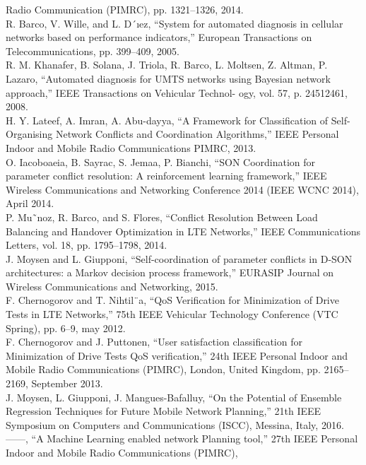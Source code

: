 \documentclass[12pt]{article}
\begin{document}
\begin{multicols}{2}
Radio Communication (PIMRC), pp. 1321–1326, 2014.
\\ \noindent [174] R. Barco, V. Wille, and L. D´ıez, “System for automated diagnosis
in cellular networks based on performance indicators,” European
Transactions on Telecommunications, pp. 399–409, 2005.
\\ \noindent [175] R. M. Khanafer, B. Solana, J. Triola, R. Barco, L. Moltsen, Z.
Altman, P. Lazaro, “Automated diagnosis for UMTS networks using
Bayesian network approach,” IEEE Transactions on Vehicular Technol-
ogy, vol. 57, p. 24512461, 2008.
\\ \noindent [176] H. Y. Lateef, A. Imran, A. Abu-dayya, “A Framework for Classification
of Self-Organising Network Conflicts and Coordination Algorithms,”
IEEE Personal Indoor and Mobile Radio Communications PIMRC,
2013.
\\ \noindent [177] O. Iacoboaeia, B. Sayrac, S. Jemaa, P. Bianchi, “SON Coordination for
parameter conflict resolution: A reinforcement learning framework,”
IEEE Wireless Communications and Networking Conference 2014
(IEEE WCNC 2014), April 2014.
\\ \noindent [178] P. Mu˜noz, R. Barco, and S. Flores, “Conflict Resolution Between
Load Balancing and Handover Optimization in LTE Networks,” IEEE
Communications Letters, vol. 18, pp. 1795–1798, 2014.
\\ \noindent [179] J. Moysen and L. Giupponi, “Self-coordination of parameter conflicts
in D-SON architectures: a Markov decision process framework,”
EURASIP Journal on Wireless Communications and Networking, 2015.
\\ \noindent [180] F. Chernogorov and T. Nihtil¨a, “QoS Verification for Minimization
of Drive Tests in LTE Networks,” 75th IEEE Vehicular Technology
Conference (VTC Spring), pp. 6–9, may 2012.
\\ \noindent [181] F. Chernogorov and J. Puttonen, “User satisfaction classification for
Minimization of Drive Tests QoS verification,” 24th IEEE Personal
Indoor and Mobile Radio Communications (PIMRC), London, United
Kingdom, pp. 2165–2169, September 2013.
\\ \noindent [182] J. Moysen, L. Giupponi, J. Mangues-Bafalluy, “On the Potential of Ensemble
Regression Techniques for Future Mobile Network Planning,”
21th IEEE Symposium on Computers and Communications (ISCC),
Messina, Italy, 2016.
\\ \noindent [183] ——, “A Machine Learning enabled network Planning tool,” 27th
IEEE Personal Indoor and Mobile Radio Communications (PIMRC),

\end{multicols}
\end{document}
